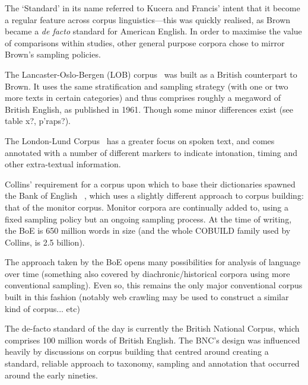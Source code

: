 The `Standard' in its name referred to Kucera and Francis' intent that it become a regular feature across corpus linguistics---this was quickly realised, as Brown became a \textsl{de facto} standard for American English.  In order to maximise the value of comparisons within studies, other general purpose corpora chose to mirror Brown's sampling policies.  


The Lancaster-Oslo-Bergen (LOB) corpus~\cite{johansson1986tagged} was built as a British counterpart to Brown.  
It uses the same stratification and sampling strategy (with one or two more texts in certain categories) and thus comprises roughly a megaword of British English, as published in 1961.  %
Though some minor differences exist (see table x?, p'raps?).


The London-Lund Corpus~\cite{greenbaum1990london}
has a greater focus on spoken text, and comes annotated with a number of different markers to indicate intonation, timing and other extra-textual information.  


Collins' requirement for a corpus upon which to base their dictionaries spawned the Bank of English~\cite{Jarvinen1994AMW991886.991985}
, which uses a slightly different approach to corpus building: that of the monitor corpus.  Monitor corpora are continually added to, using a fixed sampling policy but an ongoing sampling process.  At the time of writing, the BoE is 650 million words in size (and the whole COBUILD family used by Collins, is 2.5 billion).

The approach taken by the BoE opens many possibilities for analysis of language over time (something also covered by diachronic/historical corpora using more conventional sampling).  Even so, this remains the only major conventional corpus built in this fashion (notably web crawling may be used to construct a similar kind of corpus... etc)

The de-facto standard of the day is currently the British National Corpus, which comprises 100 million words of British English.  The BNC's design was influenced heavily by discussions on corpus building that centred around creating a standard, reliable approach to taxonomy, sampling and annotation that occurred around the early nineties.


